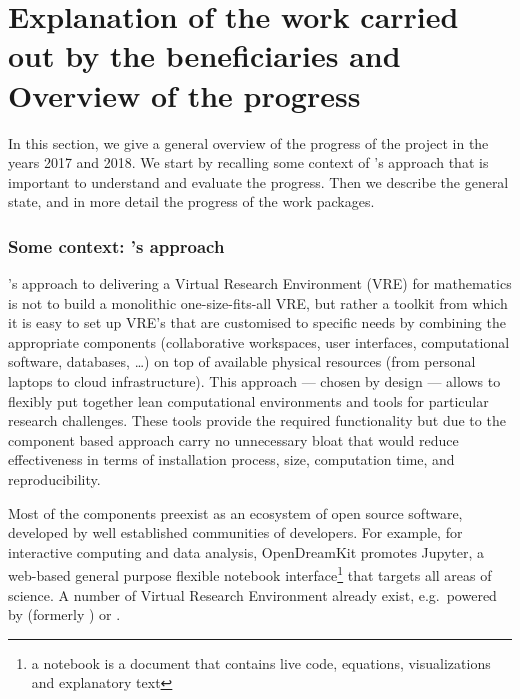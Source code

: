 \section{Explanation of the work carried out by the beneficiaries and Overview of the progress}

In this section, we give a general overview of the progress of the project in the years
2017 and 2018. We start by recalling some context of \ODK's approach that is important to
understand and evaluate the progress. Then we describe the general state, and in more
detail the progress of the work packages.

\subsubsection*{Some context: \ODK's approach}
\ODK's approach to delivering a Virtual Research Environment (VRE) for
mathematics is not to build a monolithic one-size-fits-all VRE, but
rather a toolkit from which it is easy to set up VRE's that are
customised to specific needs by combining the appropriate components
(collaborative workspaces, user interfaces, computational software,
databases, \dots) on top of available physical resources (from
personal laptops to cloud infrastructure). This approach --- chosen by
design --- allows to flexibly put together lean computational
environments and tools for particular research challenges. These tools
provide the required functionality but due to the component based
approach carry no unnecessary bloat that would reduce effectiveness in
terms of installation process, size, computation time, and
reproducibility.

Most of the components preexist as an ecosystem of open source
software, developed by well established communities of developers. For
example, for interactive computing and data analysis, OpenDreamKit
promotes Jupyter, a web-based general purpose flexible notebook
interface\footnote{a notebook is a document that contains live code,
  equations, visualizations and explanatory text} that targets all
areas of science. A number of Virtual Research Environment already
exist, e.g.\ powered by \cocalc (formerly \SMC) or \JupyterHub.

